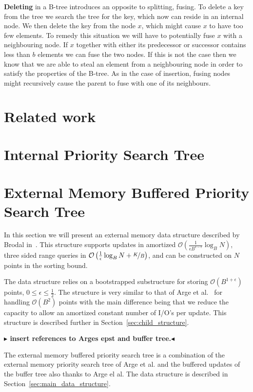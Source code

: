 \documentclass[twoside,11pt,openright]{report}
\newcommand{\todo}[1]{{\color[rgb]{.5,0,0}\textbf{$\blacktriangleright$#1$\blacktriangleleft$}}}
\begin{document}
\textbf{Deleting} in a B-tree introduces an opposite to splitting, fusing. To delete a key from the tree we search the tree for the key, which now can reside in an internal node. We then delete the key from the node $x$, which might cause $x$ to have too few elements. To remedy this situation we will have to potentially fuse $x$ with a neighbouring node. If $x$ together with either its predecessor or successor contains less than $b$ elements we can fuse the two nodes. If this is not the case then we know that we are able to steal an element from a neighbouring node in order to satisfy the properties of the B-tree. As in the case of insertion, fusing nodes might recursively cause the parent to fuse with one of its neighbours.

\chapter{Related work}


\chapter{Internal Priority Search Tree}

\chapter{External Memory Buffered Priority Search Tree}
\label{chp:epst}
In this section we will present an external memory data structure described by Brodal in~\cite{DBLP:journals/corr/Brodal15}. This structure supports updates in amortized $\mathcal{O}\left(\frac{1}{\epsilon B^{1-\epsilon}} \log_B N\right)$, three sided range queries in $\mathcal{O}\left(\frac{1}{\epsilon}\log_B N + \nicefrac{K}{B}\right)$, and can be constructed on $N$ points in the sorting bound.

The data structure relies on a bootstrapped substructure for storing $\mathcal{O}(B^{1+\epsilon})$ points, $0 \leq \epsilon \leq \frac{1}{2}$.
The structure is very similar to that of Arge et al.~\cite[Section~3.1]{arge_vitter_2003} for handling $\mathcal{O}(B^2)$ points with the main difference being that we reduce the capacity to allow an amortized constant number of I/O's per update. This structure is described further in Section~\ref{sec:child_structure}.

\todo{ insert references to Arges epst and buffer tree.}

The external memory buffered priority search tree is a combination of the external memory priority search tree of Arge et al. and the buffered updates of the buffer tree also thanks to Arge el al. The data structure is described in Section~\ref{sec:main_data_structure}.
\end{document}
